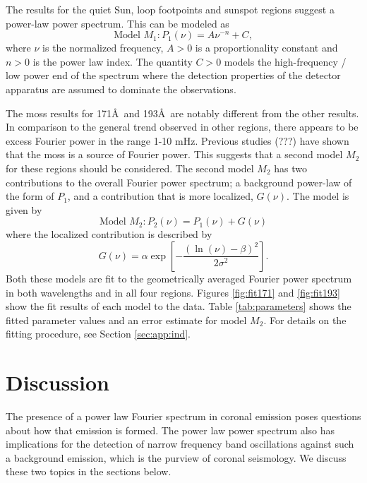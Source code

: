 \documentclass[preprint2]{aastex}
\newcommand{\PS}{power spectrum}
\newcommand{\Fps}{Fourier \PS}
\begin{document}
The results for the quiet Sun, loop footpoints and sunspot regions
suggest a power-law power spectrum.  This can be modeled as
\begin{equation}
\label{eqn:pwrlaw}
\mbox{Model $M_{1}$}: P_{1}(\nu) = A\nu^{-n} + C,
\end{equation}
where $\nu$ is the normalized frequency, $A>0$ is a proportionality
constant and $n>0$ is the power law index.  The quantity $C>0$ models
the high-frequency / low power end of the spectrum where the detection
properties of the detector apparatus are assumed to dominate the
observations.

The moss results for 171\AA\ and 193\AA\ are notably different from
the other results.  In comparison to the general trend observed in
other regions, there appears to be excess Fourier power in the range
1-10 mHz.  Previous studies (???) have shown that the moss is a source
of Fourier power.  This suggests that a second model $M_{2}$ for these
regions should be considered.  The second model $M_{2}$ has two
contributions to the overall \Fps; a background power-law of the form
of $P_{1}$, and a contribution that is more localized, $G(\nu)$.  The
model is given by
\begin{equation}
\label{eqn:pwrlawbump}
\mbox{Model $M_{2}$}: P_{2}(\nu) = P_{1}(\nu) + G(\nu)
\end{equation}
where the localized contribution is described by
\begin{equation}
\label{eqn:bump}
G(\nu) = \alpha\exp\left[-\frac{(\ln(\nu)-\beta)^{2}}{2\sigma^{2}}\right].
\end{equation}
Both these models are fit to the geometrically averaged Fourier power
spectrum in both wavelengths and in all four regions.  Figures
\ref{fig:fit171} and \ref{fig:fit193} show the fit results of
each model to the data.  Table \ref{tab:parameters} shows the fitted
parameter values and an error estimate for model $M_{2}$.  For details
on the fitting procedure, see Section \ref{sec:app:ind}.

\section{Discussion}
The presence of a power law Fourier spectrum in coronal emission poses
questions about how that emission is formed.  The power law power
spectrum also has implications for the detection of narrow frequency
band oscillations against such a background emission, which is the
purview of coronal seismology.  We discuss these two topics in the
sections below.
\end{document}
